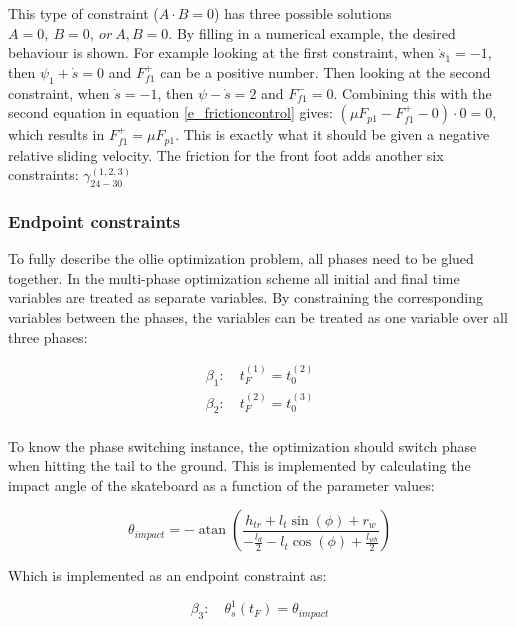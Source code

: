 \documentclass[default,iicol]{sn-jnl}
\begin{document}
{This type of constraint ($A\cdot B = 0$) has three possible solutions $A= 0,\
B=0,\ or\ A,B = 0$. By filling in a numerical example, the desired behaviour is
shown. For example looking at the first constraint, when $\dot s_1 = -1$, then
$\psi_1 + \dot s =  0$ and $F_{f1}^+$ can be a positive number. Then looking at
the second constraint, when $\dot s = -1$, then $\psi - \dot s = 2$ and
$F_{f1}^- = 0$. Combining this with the second equation in equation
\ref{e_frictioncontrol} gives: $(\mu F_{p1} - F_{f1}^+ - 0) \cdot 0 = 0$, which
results in $F_{f1}^+ = \mu F_{p1}$. This is exactly what it should be given a
negative relative sliding velocity. The friction for the front foot adds
another six constraints: $\gamma_{24-30}^{(1,2,3)}$

\subsubsection{Endpoint constraints} \label{p_endpoints}
To fully describe the ollie optimization problem, all phases need to be glued together. In the multi-phase optimization scheme all initial and final time variables are treated as separate variables. By constraining the corresponding variables between the phases, the variables can be treated as one variable over all three phases: 

\begin{equation}
    \begin{array}{c}
         \beta_1: \quad t_F^{(1)} = t_0^{(2)}  \\
         \beta_2: \quad t_F^{(2)} = t_0^{(3)}  \\
    \end{array}
\end{equation}

To know the phase switching instance, the optimization should switch phase when hitting the tail to the ground. This is implemented by calculating the impact angle of the skateboard as a function of the parameter values:

\begin{equation}
    \theta_{impact} = -\operatorname{atan}\left(\frac{h_{t r}+l_t \sin (\phi)+r_w}{-\frac{l_d}{2}-l_t \cos (\phi)+\frac{l_{w b}}{2}}\right)
\end{equation}

Which is implemented as an endpoint constraint as:

\begin{equation}
    \beta_3: \quad \theta_s^{1}(t_F) = \theta_{impact}
\end{equation}

}
\end{document}
